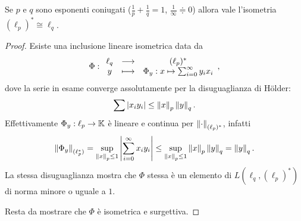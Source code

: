 \begin{proposition}\label{PrDualilp}
Se $p$ e $q$ sono esponenti coniugati ($\frac1p+\frac1q=1$, $\frac1\infty\doteqdot 0$) allora vale l'isometria $(\ell_p)^\ast\cong \ell_q$.
\end{proposition}
\begin{proof}
Esiste una inclusione lineare isometrica data da
\[\Phi:\begin{array}{ccc} {\ell_q} & \longrightarrow & {(\ell_p)^\ast}\\ {y} & \longmapsto & {\Phi_y: x\mapsto \sum_{i=0}^\infty y_ix_i} \end{array},\]
dove la serie in esame converge assolutamente per la disuguaglianza di H\"older:
\[\sum\left|{x_iy_i}\right|\leq \left\Vert{x}\right\Vert_p\left\Vert{y}\right\Vert_q.\]
Effettivamente $\Phi_y:\ell_p\to \mathbb{K}$ \`e lineare e continua per $\left\Vert{\cdot}\right\Vert_{(\ell_p)^\ast}$, infatti
\[\left\Vert{\Phi_y}\right\Vert_{(\ell_p^\ast)}=\sup_{\left\Vert{x}\right\Vert_p\leq 1}\left|{\sum_{i=0}^\infty x_iy_i}\right|\leq \sup_{\left\Vert{x}\right\Vert_p\leq 1}\left\Vert{x}\right\Vert_p\left\Vert{y}\right\Vert_q=\left\Vert{y}\right\Vert_q.\]
La stessa disuguaglianza mostra che $\Phi$ stessa \`e un elemento di $L(\ell_q,(\ell_p)^\ast)$ di norma minore o uguale a $1$.

Resta da mostrare che $\Phi$ \`e isometrica e surgettiva.


\end{proof}
